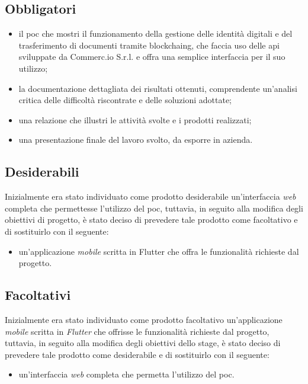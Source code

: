 \subsection{Obbligatori}
\begin{itemize}
	\item il \gls{poc} che mostri il funzionamento della gestione delle identità digitali e del trasferimento di documenti tramite \gls{blockchaing}, che faccia uso delle \gls{api} sviluppate da Commerc.io S.r.l. e offra una semplice interfaccia per il suo utilizzo;
	\item la documentazione dettagliata dei risultati ottenuti, comprendente un'analisi critica delle difficoltà riscontrate e delle soluzioni adottate;
	\item una relazione che illustri le attività svolte e i prodotti realizzati;
	\item una presentazione finale del lavoro svolto, da esporre in azienda.
\end{itemize}

\subsection{Desiderabili}

Inizialmente era stato individuato come prodotto desiderabile un'interfaccia \textit{web} completa che permettesse l'utilizzo del \gls{poc}, tuttavia, in seguito alla modifica degli obiettivi di progetto, è stato deciso di prevedere tale prodotto come facoltativo e di sostituirlo con il seguente:

\begin{itemize}
	\item un'applicazione \textit{mobile} scritta in Flutter che offra le funzionalità richieste dal progetto.
\end{itemize}

\subsection{Facoltativi}

Inizialmente era stato individuato come prodotto facoltativo un'applicazione \textit{mobile} scritta in \textit{Flutter} che offrisse le funzionalità richieste dal progetto, tuttavia, in seguito alla modifica degli obiettivi dello stage, è stato deciso di prevedere tale prodotto come desiderabile e di sostituirlo con il seguente:

\begin{itemize}
	\item un'interfaccia \textit{web} completa che permetta l'utilizzo del \gls{poc}.
\end{itemize} 

